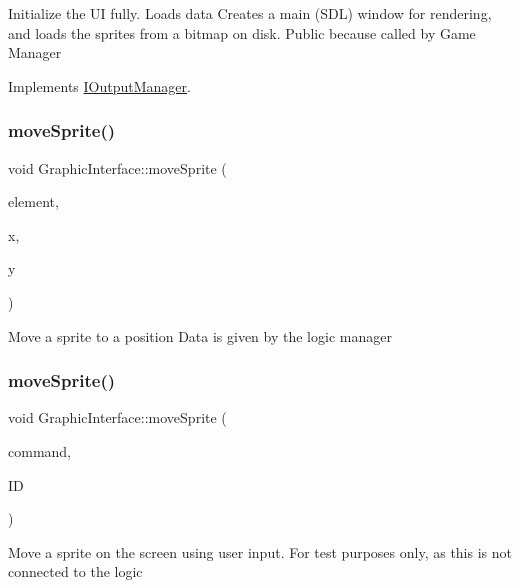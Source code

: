 Initialize the UI fully. Loads data Creates a main (S\+DL) window for rendering, and loads the sprites from a bitmap on disk. Public because called by Game Manager 

Implements \mbox{\hyperlink{class_i_output_manager_a50a935d76cf10427b0977406a2338146}{I\+Output\+Manager}}.

\mbox{\label{class_graphic_interface_a2a52c6fef543c4f130f62ee4552648f9}} 
\subsubsection{\texorpdfstring{move\+Sprite()}{moveSprite()}\hspace{0.1cm}{\footnotesize\ttfamily [1/2]}}
{\footnotesize\ttfamily void Graphic\+Interface\+::move\+Sprite (\begin{DoxyParamCaption}\item[{\mbox{\hyperlink{class_game_sprite}{Game\+Sprite}} $\ast$}]{element,  }\item[{int}]{x,  }\item[{int}]{y }\end{DoxyParamCaption})}

Move a sprite to a position Data is given by the logic manager \mbox{\label{class_graphic_interface_a8062b59b90fa4075903ddc122f2ba8ed}} 
\subsubsection{\texorpdfstring{move\+Sprite()}{moveSprite()}\hspace{0.1cm}{\footnotesize\ttfamily [2/2]}}
{\footnotesize\ttfamily void Graphic\+Interface\+::move\+Sprite (\begin{DoxyParamCaption}\item[{User\+Input\+Type}]{command,  }\item[{std\+::string}]{ID }\end{DoxyParamCaption})}

Move a sprite on the screen using user input. For test purposes only, as this is not connected to the logic \mbox{\label{class_graphic_interface_a250275a6b20097a3c3435a9af4d1cd75}} 
